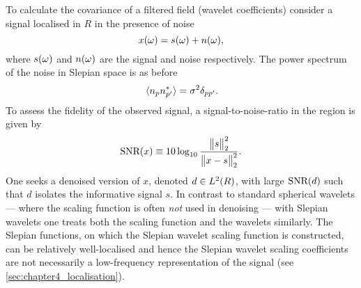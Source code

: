 To calculate the covariance of a filtered field (wavelet coefficients) consider a signal localised in \(R\) in the presence of noise
%
\begin{equation}\label{eq:chapter4_noised_signal}
	\pixel{x} = \pixel{s} + \pixel{n},
\end{equation}
%
where \(\pixel{s}\) and \(\pixel{n}\) are the signal and noise respectively.
The power spectrum of the noise in Slepian space is as before
%
\begin{equation}
	\expval*{\slepian{n} \conj{\slepian[']{n}}}
	= \sigma^{2} \delta_{pp'}.
\end{equation}
%
To assess the fidelity of the observed signal, a signal-to-noise-ratio in the region is given by
%
\begin{equation}\label{eq:chapter4_signal_to_noise}
	\snr{x}
	\equiv 10 \log_{10} \frac{\norm{s}^{2}}{\norm{x - s}^{2}}.
\end{equation}
%
One seeks a denoised version of \(x\), denoted \(d \in \hilbert{R}\), with large \(\snr{d}\) such that \(d\) isolates the informative signal \(s\).
In contrast to standard spherical wavelets --- where the scaling function is often \emph{not} used in denoising --- with Slepian wavelets one treats both the scaling function and the wavelets similarly.
The Slepian functions, on which the Slepian wavelet scaling function is constructed, can be relatively well-localised and hence the Slepian wavelet scaling coefficients are not necessarily a low-frequency representation of the signal (see \cref{sec:chapter4_localisation}).

